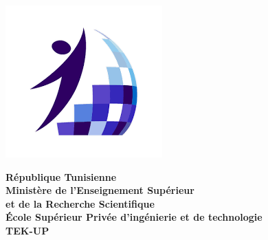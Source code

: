 
\thispagestyle{cover}%
\hspace{-47pt}
\begin{minipage}[l]{0.2\columnwidth}
\vspace{6mm}
\includegraphics[width=1.1\columnwidth]{img/tekup.png}\\
\end{minipage}
\hfill
\begin{minipage}[l]{0.6\columnwidth}
\centering
\footnotesize
\textbf{{République Tunisienne}}\\
\vspace{1.5mm}
\textbf{{Ministère de l'Enseignement Supérieur\\
et de la Recherche Scientifique}}\\
\vspace{1.5mm}
\vspace{1.5mm}
\textbf{{École Supérieur Privée d'ingénierie et de technologie}}\\
\vspace{1.5mm}
\textbf{{TEK-UP}}\\
\vspace{1.5mm}
\end{minipage}
